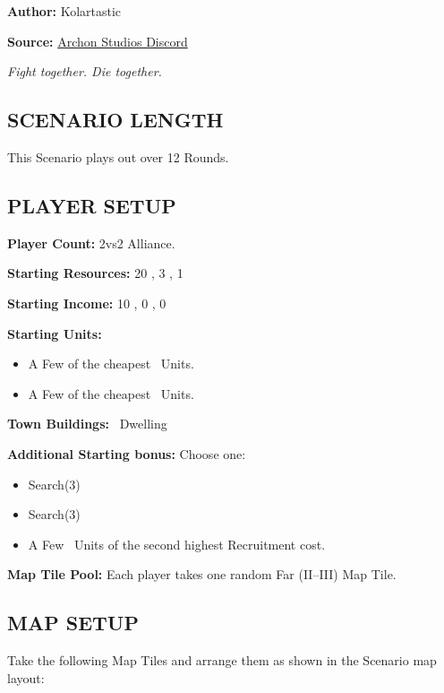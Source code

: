 
\begin{multicols*}{2}

\textbf{Author:} Kolartastic

\textbf{Source:} \href{https://discord.com/channels/740870068178649108/1161571991732625468/threads/1164804609605390386}{Archon Studios Discord}

\textit{Fight together. Die together.}  %

\subsection*{\MakeUppercase{Scenario Length}}
This Scenario plays out over 12 Rounds.

\subsection*{\MakeUppercase{Player Setup}}
\textbf{Player Count:} 2vs2 Alliance.

\textbf{Starting Resources:} 20 , 3 , 1 

\textbf{Starting Income:} 10 , 0 , 0 

\textbf{Starting Units:}

\begin{itemize}
  \item A Few of the cheapest \bronze\ Units.
  \item A Few of the cheapest \silver\ Units.
\end{itemize}

\textbf{Town Buildings:} \bronze\ Dwelling

\textbf{Additional Starting bonus:}
Choose one:
\begin{itemize}
  \item Search(3) 
  \item Search(3) 
  \item A Few \bronze\ Units of the second highest Recruitment cost.
\end{itemize}

\textbf{Map Tile Pool:} Each player takes one random Far (II–III) Map Tile.

\subsection*{\MakeUppercase{Map Setup}}
Take the following Map Tiles and arrange them as shown in the Scenario map layout:


\end{multicols*}
